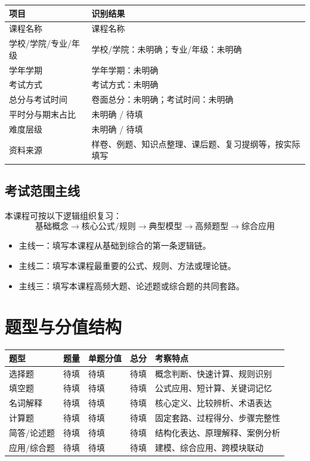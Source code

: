 \documentclass[UTF8,zihao=-4]{ctexart}
\newcommand{\CourseName}{课程名称}
\newcommand{\SchoolInfo}{学校/学院：未明确}
\newcommand{\MajorInfo}{专业/年级：未明确}
\newcommand{\TermInfo}{学年学期：未明确}
\newcommand{\ExamType}{考试方式：未明确}
\newcommand{\ExamTime}{考试时间：未明确}
\newcommand{\TotalScore}{卷面总分：未明确}
\begin{document}
\begin{longtable}{p{}p{}}
\toprule
\textbf{项目} & \textbf{识别结果} \\
\midrule
课程名称 & \CourseName \\
学校/学院/专业/年级 & \SchoolInfo；\MajorInfo \\
学年学期 & \TermInfo \\
考试方式 & \ExamType \\
总分与考试时间 & \TotalScore；\ExamTime \\
平时分与期末占比 & 未明确 / 待填 \\
难度层级 & 未明确 / 待填 \\
资料来源 & 样卷、例题、知识点整理、课后题、复习提纲等，按实际填写 \\
\bottomrule
\end{longtable}

\subsection{考试范围主线}

本课程可按以下逻辑组织复习：
\[
\text{基础概念} \to \text{核心公式/规则} \to \text{典型模型} \to \text{高频题型} \to \text{综合应用}
\]

\begin{keybox}[本课程最终主线]
\begin{itemize}
  \item 主线一：填写本课程从基础到综合的第一条逻辑链。
  \item 主线二：填写本课程最重要的公式、规则、方法或理论链。
  \item 主线三：填写本课程高频大题、论述题或综合题的共同套路。
\end{itemize}
\end{keybox}

\section{题型与分值结构}

\begin{longtable}{p{}p{}p{}p{}p{}}
\toprule
\textbf{题型} & \textbf{题量} & \textbf{单题分值} & \textbf{总分} & \textbf{考察特点} \\
\midrule
选择题 & 待填 & 待填 & 待填 & 概念判断、快速计算、规则识别 \\
填空题 & 待填 & 待填 & 待填 & 公式应用、短计算、关键词记忆 \\
名词解释 & 待填 & 待填 & 待填 & 核心定义、比较辨析、术语表达 \\
计算题 & 待填 & 待填 & 待填 & 固定套路、过程得分、步骤完整性 \\
简答/论述题 & 待填 & 待填 & 待填 & 结构化表达、原理解释、案例分析 \\
应用/综合题 & 待填 & 待填 & 待填 & 建模、综合应用、跨模块联动 \\
\bottomrule
\end{longtable}
\end{document}
